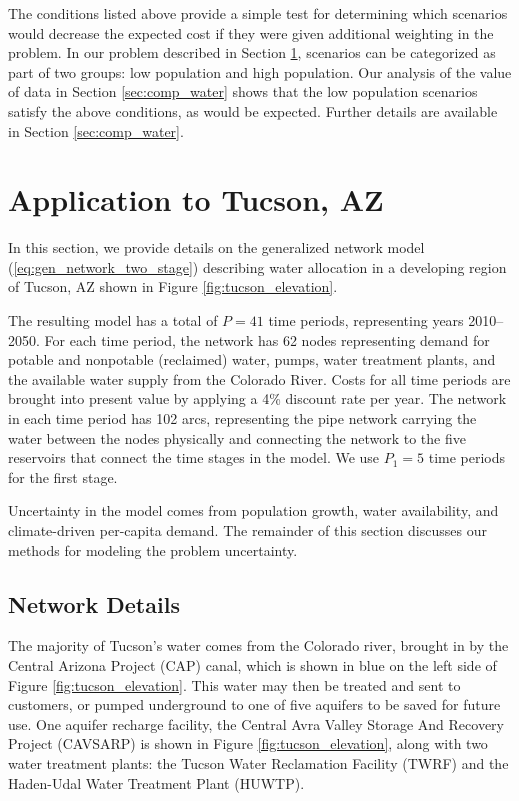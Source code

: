 \documentclass[11pt]{article}
\theoremstyle{plain}
\theoremstyle{definition}
\theoremstyle{remark}
\begin{document}
The conditions listed above provide a simple test for determining which scenarios would decrease the expected cost if they were given additional weighting in the problem.
In our problem described in Section \ref{sec:water}, scenarios can be categorized as part of two groups: low population and high population.
Our analysis of the value of data in Section \ref{sec:comp_water} shows that the low population scenarios satisfy the above conditions, as would be expected.
Further details are available in Section \ref{sec:comp_water}.



\section{Application to Tucson, AZ}
\label{sec:water}

In this section, we provide details on the generalized network model (\ref{eq:gen_network_two_stage}) describing water allocation in a developing region of Tucson, AZ shown in Figure \ref{fig:tucson_elevation}.

The resulting model has a total of $P = 41$ time periods, representing years 2010--2050.
For each time period, the network has 62 nodes representing demand for potable and nonpotable (reclaimed) water, pumps, water treatment plants, and the available water supply from the Colorado River.
Costs for all time periods are brought into present value by applying a 4\% discount rate per year.
The network in each time period has 102 arcs, representing the pipe network carrying the water between the nodes physically and connecting the network to the five reservoirs that connect the time stages in the model.
We use $P_1 = 5$ time periods for the first stage.

Uncertainty in the model comes from population growth, water availability, and climate-driven per-capita demand.
The remainder of this section discusses our methods for modeling the problem uncertainty.


\subsection{Network Details}

The majority of Tucson's water comes from the Colorado river, brought in by the Central Arizona Project (CAP) canal, which is shown in blue on the left side of Figure \ref{fig:tucson_elevation}.
This water may then be treated and sent to customers, or pumped underground to one of five aquifers to be saved for future use.
One aquifer recharge facility, the Central Avra Valley Storage And Recovery Project (CAVSARP) is shown in Figure \ref{fig:tucson_elevation}, along with two water treatment plants: the Tucson Water Reclamation Facility (TWRF) and the Haden-Udal Water Treatment Plant (HUWTP).
\end{document}

